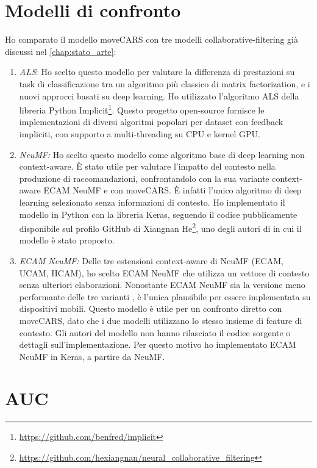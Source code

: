 \documentclass[12pt,italian]{report}
\begin{document}
\section{Modelli di confronto} \label{sec:comp-model}
Ho comparato il modello moveCARS con tre modelli collaborative-filtering già discussi nel \autoref{chap:stato_arte}:
\begin{enumerate}
\item \textit{ALS}: Ho scelto questo modello per valutare la differenza di prestazioni su task di classificazione tra un algoritmo più classico di matrix factorization,
e i nuovi approcci basati su deep learning. Ho utilizzato l'algoritmo ALS della libreria Python Implicit\footnote{\url{https://github.com/benfred/implicit}}. Questo progetto open-source fornisce le implementazioni di diversi algoritmi popolari per dataset con feedback impliciti, con supporto a multi-threading su CPU e kernel GPU. 

\item \textit{NeuMF:} Ho scelto questo modello come algoritmo base di deep learning non context-aware. \`E stato utile 
per valutare l'impatto del contesto nella produzione di raccomandazioni, confrontandolo con la sua variante context-aware ECAM NeuMF e con moveCARS. \`E infatti l'unico algoritmo di deep learning selezionato senza informazioni di contesto. Ho implementato il modello in Python con la libreria Keras, seguendo il codice pubblicamente disponibile sul profilo GitHub di Xiangnan He\footnote{\url{https://github.com/hexiangnan/neural_collaborative_filtering}}, uno degli autori di \cite{NCF} in cui il modello è stato proposto.

\item \textit{ECAM NeuMF:} Delle tre estensioni context-aware di NeuMF (ECAM, UCAM, HCAM), ho scelto ECAM NeuMF che utilizza un vettore di contesto senza ulteriori elaborazioni. Nonostante ECAM NeuMF sia la versione meno performante delle tre varianti \cite{context-aware-deep-learning}, è l'unica plausibile per essere implementata su dispositivi mobili. Questo modello è utile per un confronto diretto con moveCARS, dato che i due modelli utilizzano lo stesso insieme di feature di contesto. Gli autori del modello non hanno rilasciato il codice sorgente o dettagli sull'implementazione. Per questo motivo ho implementato ECAM NeuMF in Keras, a partire da NeuMF.
\end{enumerate}

\section{AUC} \label{sec:auc}
\end{document}
